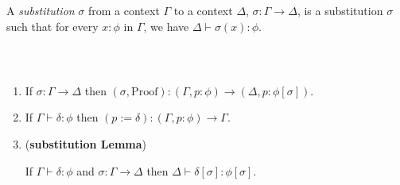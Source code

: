 A \emph{substitution} $\sigma$ from a context $\Gamma$ to a context $\Delta$, $\sigma : \Gamma \rightarrow \Delta$,  is a substitution $\sigma$ such that
for every $x : \phi$ in $\Gamma$, we have $\Delta \vdash \sigma(x) : \phi$.

\begin{code}%
\> \AgdaSymbol{:}  \AgdaSymbol{\{}\AgdaSymbol{\}} \AgdaSymbol{\{}\AgdaSymbol{\}}            \<%
\\
\>     \AgdaSymbol{=}       \AgdaSymbol{\_}        \<%
\end{code}

\begin{lemma}$ $
\begin{enumerate}
\item
If $\sigma : \Gamma \rightarrow \Delta$ then $(\sigma , \mathrm{Proof}) : (\Gamma , p : \phi) \rightarrow (\Delta , p : \phi [ \sigma ])$.
\item
If $\Gamma \vdash \delta : \phi$ then $(p := \delta) : (\Gamma, p : \phi) \rightarrow \Gamma$.
\item
(\textbf{substitution Lemma})

If $\Gamma \vdash \delta : \phi$ and $\sigma : \Gamma \rightarrow \Delta$ then $\Delta \vdash \delta [ \sigma ] : \phi [ \sigma ]$.
\end{enumerate}
\end{lemma}

\begin{code}%
\> \AgdaSymbol{:}  \AgdaSymbol{\{}\AgdaSymbol{\}} \AgdaSymbol{\{}\AgdaSymbol{\}} \AgdaSymbol{\{}\AgdaSymbol{\}} \<[30]%
\>[30]\<%
\\
\>[0]\<[2]%
\>[2]\AgdaSymbol{\{} \AgdaSymbol{:}  \AgdaSymbol{\}} \AgdaSymbol{\{} \AgdaSymbol{:}  \AgdaSymbol{\}} \AgdaSymbol{\{} \AgdaSymbol{:}  \AgdaSymbol{\}}  \<[48]%
\>[48]\<%
\\
\>[0]\<[2]%
\>[2]          \AgdaSymbol{(}  \AgdaSymbol{)}  \AgdaSymbol{(}     \AgdaSymbol{)}\<%
\end{code}

